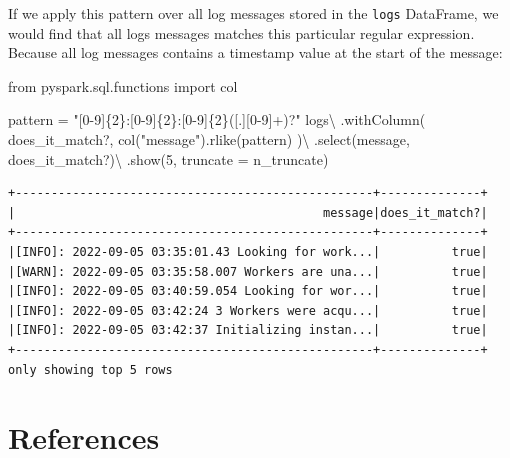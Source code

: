 \documentclass[
  11pt,
  letterpaper,
  DIV=11,
  numbers=noendperiod]{scrreprt}
\newenvironment{Shaded}{\begin{snugshade}}{\end{snugshade}}
\newcommand{\DecValTok}[1]{\textcolor[rgb]{0.68,0.00,0.00}{#1}}
\newcommand{\ImportTok}[1]{\textcolor[rgb]{0.00,0.46,0.62}{#1}}
\newcommand{\NormalTok}[1]{\textcolor[rgb]{0.00,0.23,0.31}{#1}}
\newcommand{\OperatorTok}[1]{\textcolor[rgb]{0.37,0.37,0.37}{#1}}
\newcommand{\SpecialCharTok}[1]{\textcolor[rgb]{0.37,0.37,0.37}{#1}}
\newcommand{\StringTok}[1]{\textcolor[rgb]{0.13,0.47,0.30}{#1}}
\begin{document}
If we apply this pattern over all log messages stored in the
\texttt{logs} DataFrame, we would find that all logs messages matches
this particular regular expression. Because all log messages contains a
timestamp value at the start of the message:

\begin{Shaded}
\begin{Highlighting}[]
\ImportTok{from}\NormalTok{ pyspark.sql.functions }\ImportTok{import}\NormalTok{ col}

\NormalTok{pattern }\OperatorTok{=} \StringTok{"[0{-}9]}\SpecialCharTok{\{2\}}\StringTok{:[0{-}9]}\SpecialCharTok{\{2\}}\StringTok{:[0{-}9]}\SpecialCharTok{\{2\}}\StringTok{([.][0{-}9]+)?"}
\NormalTok{logs}\OperatorTok{\textbackslash{}}
\NormalTok{    .withColumn(}
        \StringTok{\textquotesingle{}does\_it\_match?\textquotesingle{}}\NormalTok{,}
\NormalTok{        col(}\StringTok{"message"}\NormalTok{).rlike(pattern)}
\NormalTok{    )}\OperatorTok{\textbackslash{}}
\NormalTok{    .select(}\StringTok{\textquotesingle{}message\textquotesingle{}}\NormalTok{, }\StringTok{\textquotesingle{}does\_it\_match?\textquotesingle{}}\NormalTok{)}\OperatorTok{\textbackslash{}}
\NormalTok{    .show(}\DecValTok{5}\NormalTok{, truncate }\OperatorTok{=}\NormalTok{ n\_truncate)}
\end{Highlighting}
\end{Shaded}

\begin{verbatim}
+--------------------------------------------------+--------------+
|                                           message|does_it_match?|
+--------------------------------------------------+--------------+
|[INFO]: 2022-09-05 03:35:01.43 Looking for work...|          true|
|[WARN]: 2022-09-05 03:35:58.007 Workers are una...|          true|
|[INFO]: 2022-09-05 03:40:59.054 Looking for wor...|          true|
|[INFO]: 2022-09-05 03:42:24 3 Workers were acqu...|          true|
|[INFO]: 2022-09-05 03:42:37 Initializing instan...|          true|
+--------------------------------------------------+--------------+
only showing top 5 rows
\end{verbatim}


\hypertarget{references}{%
\chapter*{References}\label{references}}
\end{document}
